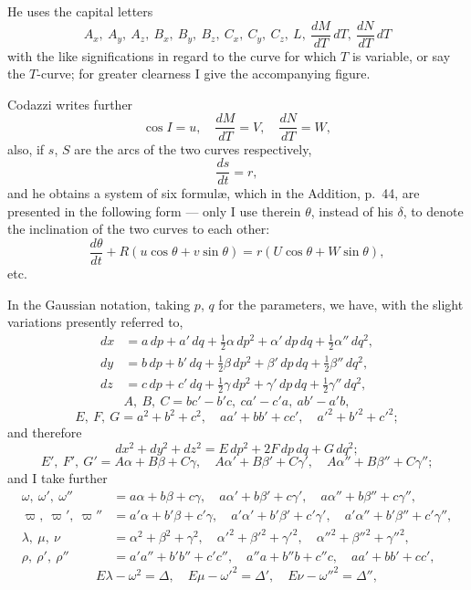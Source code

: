 \documentclass[11pt,a4paper]{book}
\begin{document}
He uses the capital letters
\[
A_x,\ A_y,\ A_z,\ B_x,\ B_y,\ B_z,\ C_x,\ C_y,\ C_z,\ L,\ \frac{dM}{dT}\,dT,\ \frac{dN}{dT}\,dT
\]
with the like significations in regard to the curve for which $T$ is variable, or say
the $T$-curve; for greater clearness I give the accompanying figure.

Codazzi writes further
\[
\cos I = u, \quad
\frac{dM}{dT} = V, \quad
\frac{dN}{dT} = W,
\]
also, if $s$, $S$ are the arcs of the two curves respectively,
\[
\frac{ds}{dt} = r,
\]
and he obtains a system of six formul\ae, which in the Addition, p.\ 44, are presented
in the following form --- only I use therein $\theta$, instead of his $\delta$, to denote the
inclination of the two curves to each other:
\[
\frac{d\theta}{dt} + R(u\cos\theta + v\sin\theta) = r(U\cos\theta + W\sin\theta),
\]
etc.

In the Gaussian notation, taking $p$, $q$ for the parameters, we have, with the slight
variations presently referred to,
\begin{align*}
dx &= a\,dp + a'\,dq + \tfrac12\alpha\,dp^2 + \alpha'\,dp\,dq + \tfrac12\alpha''\,dq^2,\\
dy &= b\,dp + b'\,dq + \tfrac12\beta\,dp^2 + \beta'\,dp\,dq + \tfrac12\beta''\,dq^2,\\
dz &= c\,dp + c'\,dq + \tfrac12\gamma\,dp^2 + \gamma'\,dp\,dq + \tfrac12\gamma''\,dq^2,
\end{align*}
\[
A,\ B,\ C = bc' - b'c,\ ca' - c'a,\ ab' - a'b,
\]
\[
E,\ F,\ G = a^2 + b^2 + c^2,\quad aa' + bb' + cc',\quad a'^2 + b'^2 + c'^2;
\]
and therefore
\[
dx^2 + dy^2 + dz^2 = E\,dp^2 + 2F\,dp\,dq + G\,dq^2;
\]
\[
E',\ F',\ G' = A\alpha + B\beta + C\gamma,\quad A\alpha' + B\beta' + C\gamma',\quad
A\alpha'' + B\beta'' + C\gamma'';
\]
and I take further
\begin{align*}
\omega,\ \omega',\ \omega'' &= a\alpha + b\beta + c\gamma,\quad a\alpha' + b\beta' + c\gamma',\quad
a\alpha'' + b\beta'' + c\gamma'',\\
\varpi,\ \varpi',\ \varpi'' &= a'\alpha + b'\beta + c'\gamma,\quad a'\alpha' + b'\beta' + c'\gamma',\quad
a'\alpha'' + b'\beta'' + c'\gamma'',\\
\lambda,\ \mu,\ \nu &= \alpha^2 + \beta^2 + \gamma^2,\quad \alpha'^2 + \beta'^2 + \gamma'^2,\quad
\alpha''^2 + \beta''^2 + \gamma''^2,\\
\rho,\ \rho',\ \rho'' &= a'a'' + b'b'' + c'c'',\quad a''a + b''b + c''c,\quad aa' + bb' + cc',
\end{align*}
\[
E\lambda - \omega^2 = \Delta, \quad E\mu - \omega'^2 = \Delta', \quad
E\nu - \omega''^2 = \Delta'',
\]
\end{document}
